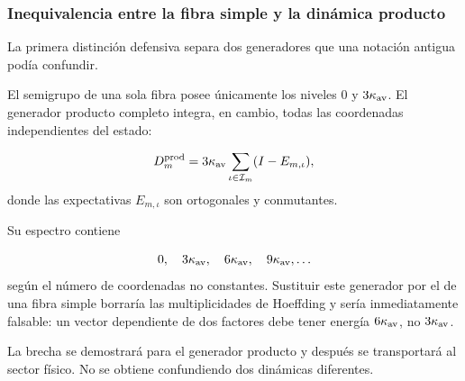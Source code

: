\subsubsection{Inequivalencia entre la fibra simple y la dinámica producto}
La primera distinción defensiva separa dos generadores que una notación antigua podía confundir.\par
El semigrupo de una sola fibra posee únicamente los niveles \(0\) y \(3\kappa_{\rm av}\). El generador producto completo integra, en cambio, todas las coordenadas independientes del estado:\par
\[
D_m^{\rm prod}
=
3\kappa_{\rm av}
\sum_{\iota\in\mathcal I_m}(I-E_{m,\iota}),
\]
donde las expectativas \(E_{m,\iota}\) son ortogonales y conmutantes.\par
Su espectro contiene\par
\[
0,\quad
3\kappa_{\rm av},\quad
6\kappa_{\rm av},\quad
9\kappa_{\rm av},\ldots
\]
según el número de coordenadas no constantes. Sustituir este generador por el de una fibra simple borraría las multiplicidades de Hoeffding y sería inmediatamente falsable: un vector dependiente de dos factores debe tener energía \(6\kappa_{\rm av}\), no \(3\kappa_{\rm av}\).\par
La brecha se demostrará para el generador producto y después se transportará al sector físico. No se obtiene confundiendo dos dinámicas diferentes.\par
{}
